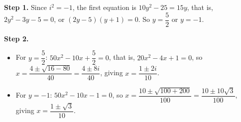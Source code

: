 \textbf{Step 1.} Since $i^2=-1$, the first equation is $10y^2-25=15y$, that is, $2y^2-3y-5=0$, or $(2y-5)(y+1)=0$. So $y=\dfrac52$ or $y=-1$.

\textbf{Step 2.}
\begin{itemize}
\item For $y=\dfrac52$: $50x^2-10x+\dfrac52=0$, that is, $20x^2-4x+1=0$, so $x=\dfrac{4\pm\sqrt{16-80}}{40}=\dfrac{4\pm8i}{40}$, giving $\boxed{x=\dfrac{1\pm2i}{10}}$.
\item For $y=-1$: $50x^2-10x-1=0$, so $x=\dfrac{10\pm\sqrt{100+200}}{100}=\dfrac{10\pm10\sqrt3}{100}$, giving $\boxed{x=\dfrac{1\pm\sqrt3}{10}}$.
\end{itemize}
